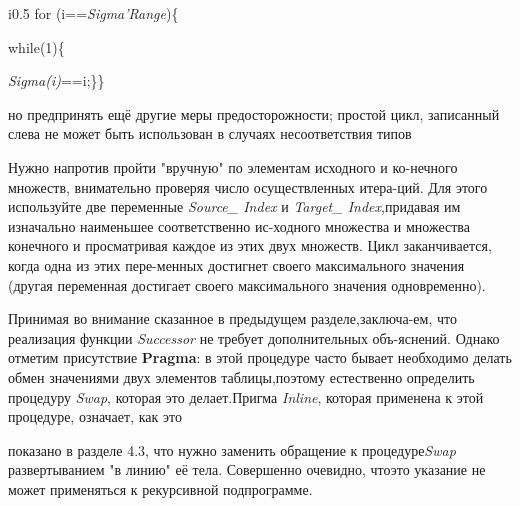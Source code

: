 \documentclass{mai_book}
\begin{document}
\begin{wrapfigure}{i}{0.5\textwidth}
for (i==\textit{Sigma'Range})\{

   while(1)\{
   
   \textit{Sigma(i)}==i;\}\}
\end{wrapfigure}

  \noindent но предпринять ещё другие меры предосторожности; простой цикл, записанный слева не может быть использован в случаях несоответствия типов 

Нужно напротив пройти "вручную" по элементам исходного и ко-\linebreak нечного множеств, внимательно проверяя число осуществленных итера-\linebreak ций. Для этого используйте две переменные \textit{Source\_ Index} и \textit{Target\_ Index},\linebreak придавая им изначально наименьшее соответственно ис-\linebreak ходного множества и множества конечного и просматривая каждое из \linebreak этих двух множеств. Цикл заканчивается, когда одна из этих пере-\linebreak менных достигнет своего максимального значения (другая переменная \linebreak достигает своего максимального значения одновременно).\newline 

Принимая во внимание сказанное в предыдущем разделе,заключа-\linebreak ем, что реализация функции \textit{Successor} не требует дополнительных объ-\linebreak яснений. Однако отметим присутствие \textbf{Pragma}: в этой процедуре часто \linebreak бывает необходимо делать обмен значениями двух элементов таблицы,\linebreak поэтому естественно определить процедуру \textit{Swap}, которая это делает.\linebreak Пригма \textit{Inline}, которая применена к этой процедуре, означает, как это \newline 
\newpage

показано в разделе 4.3, что нужно заменить обращение к процедуре\linebreak \textit{Swap} развертыванием "в линию" её тела. Совершенно очевидно, что\linebreak это указание не может применяться к рекурсивной подпрограмме. 
\end{document}
